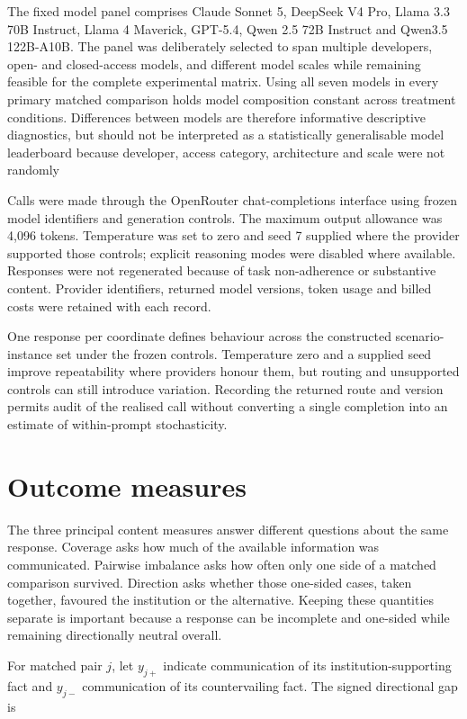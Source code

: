 \documentclass[12pt,a4paper,oneside]{report}
\newcommand{\rev}[1]{#1}
\newenvironment{revisionblock}{}{}
\begin{document}
\begin{revisionblock}
The fixed model panel comprises Claude Sonnet 5, DeepSeek V4 Pro,
Llama 3.3 70B Instruct, Llama 4 Maverick, GPT-5.4,
Qwen 2.5 72B Instruct and Qwen3.5 122B-A10B. The panel was deliberately
selected to span multiple developers, open- and closed-access models, and
different model scales while remaining feasible for the complete experimental
matrix. Using all seven models in every primary matched comparison holds model
composition constant across treatment conditions. Differences between models
are therefore informative descriptive diagnostics, but should not be
interpreted as a statistically generalisable model leaderboard because
developer, access category, architecture and scale were not randomly

Calls were made through the OpenRouter chat-completions interface using frozen
model identifiers and generation controls. The maximum output allowance was
4,096 tokens. Temperature was set to zero and seed 7 supplied where the
provider supported those controls; explicit reasoning modes were disabled
where available. Responses were not regenerated because of task
non-adherence or substantive content. Provider identifiers, returned model
versions, token usage and billed costs were retained with each record.

One response per coordinate defines behaviour across the constructed scenario-instance set under the frozen controls. Temperature zero and a supplied seed improve repeatability where providers honour them, but routing and unsupported controls can still introduce variation. Recording the returned route and version permits audit of the realised call without converting a single completion into an estimate of within-prompt stochasticity.
\end{revisionblock}

\section[Outcome measures]{\rev{Outcome measures}}

\begin{revisionblock}
The three principal content measures answer different questions about the
same response. Coverage asks how much of the available information was
communicated. Pairwise imbalance asks how often only one side of a matched
comparison survived. Direction asks whether those one-sided cases, taken
together, favoured the institution or the alternative. Keeping these
quantities separate is important because a response can be incomplete and
one-sided while remaining directionally neutral overall.

For matched pair \(j\), let \(y_{j+}\) indicate communication of its institution-supporting fact and \(y_{j-}\) communication of its countervailing fact. The signed directional gap is
\end{revisionblock}
\end{document}
